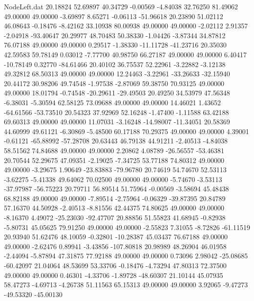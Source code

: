 \begin{filecontents}{NodeLeft.dat}
  20.18824   52.69897   40.34729    -0.00569   -4.84038   32.76250   81.49062   49.00000   49.00000   -3.69897    8.65271   -0.06113  -51.96618
  20.23890   51.02112   46.08643    -0.18476   -8.42162   33.10938   80.00938   49.00000   49.00000   -2.02112    2.91357   -2.04918  -93.40647
  20.29977   48.70483   50.38330    -1.04426   -3.87344   34.87812   76.07188   49.00000   49.00000    0.29517   -1.38330  -11.11728  -41.23716
  20.35030   42.59583   59.78149     0.03012   -7.77700   40.98750   66.27187   49.00000   49.00000    6.40417  -10.78149    0.32770  -84.61466
  20.40102   36.75537   52.22961    -3.22882   -3.12138   49.32812   68.50313   49.00000   49.00000   12.24463   -3.22961  -33.26633  -32.15940
  20.44172   30.98206   49.74548    -1.97538   -2.87069   59.38750   70.93125   49.00000   49.00000   18.01794   -0.74548  -20.29611  -29.49503
  20.49250   34.53979   47.56348    -6.38031   -5.30594   62.58125   73.09688   49.00000   49.00000   14.46021    1.43652  -64.61566  -53.73510
  20.54323   37.92969   52.16248    -1.47400   -1.11588   63.42188   69.60313   49.00000   49.00000   11.07031   -3.16248  -14.98007  -11.34051
  20.58369   44.60999   49.61121    -6.30869   -5.48500   60.17188   70.29375   49.00000   49.00000    4.39001   -0.61121  -65.88992  -57.28708
  20.63443   46.79138   44.91211    -2.40513   -4.84038   58.51562   74.84688   49.00000   49.00000    2.20862    4.08789  -26.56557  -53.46381
  20.70544   52.29675   47.09351    -2.19025   -7.34725   53.77188   74.80312   49.00000   49.00000   -3.29675    1.90649  -23.83883  -79.96780
  20.74619   54.74670   52.53113    -3.62275   -5.41338   49.64062   70.02500   49.00000   49.00000   -5.74670   -3.53113  -37.97987  -56.75223
  20.79711   56.89514   51.75964    -0.00569   -3.58694   45.48438   68.82188   49.00000   49.00000   -7.89514   -2.75964   -0.06329  -39.87395
  20.84789   57.16370   44.50928    -2.40513   -8.81556   42.44375   74.80625   49.00000   49.00000   -8.16370    4.49072  -25.23030  -92.47707
  20.88856   51.55823   41.68945    -0.82938   -5.80731   45.05625   79.91250   49.00000   49.00000   -2.55823    7.31055   -8.72826  -61.11519
  20.93940   51.62476   48.10059    -0.32801  -10.28387   45.03437   76.67188   49.00000   49.00000   -2.62476    0.89941   -3.43856 -107.80818
  20.98989   48.26904   46.01958    -2.44094   -5.87894   47.31875   77.92188   49.00000   49.00000    0.73096    2.98042  -25.08685  -60.42097
  21.04064   48.53699   53.33706    -0.18476   -4.73294   47.80313   72.37500   49.00000   49.00000    0.46301   -4.33706   -1.89728  -48.60307
  21.10144   45.07935   58.47273    -4.69713   -4.26738   51.11563   65.15313   49.00000   49.00000    3.92065   -9.47273  -49.53320  -45.00130

\end{filecontents}
